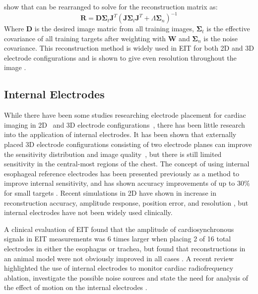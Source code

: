  show that  can 
be rearranged to solve for the reconstruction matrix
as:
\begin{equation} 
	\mathbf{R} = \mathbf{D}  
	\mathbf{\Sigma}_t \mathbf{J}^T(\mathbf{J}  
	 \mathbf{\Sigma}_t  \mathbf{J}^T + 
	 \Lambda \mathbf{\Sigma}_n)^{-1}
\end{equation}
Where $\mathbf{D}$ is the desired image matric from all training images,
$\mathbf{\Sigma}_t$  is the effective covariance of all training targets after weighting with 
$\mathbf{W}$ and 
$\mathbf{\Sigma}_n$ is the noise covariance. 
This reconstruction method is widely used in EIT for both 2D and 3D electrode configurations 
and is shown to give even resolution throughout the image \parencite{adler_greit_2009}.

\subsection{Internal Electrodes}

While there have been some studies researching electrode placement for cardiac
imaging in 2D~\parencite{vonk_noordegraaf_improvement_1996} and 
3D electrode configurations~\parencite{graham_electrode_2007}, there has 
been little research into the application of internal electrodes. 
It has been shown that externally placed 3D electrode configurations
consisting of two electrode planes
can improve the sensitivity distribution and image quality~\parencite{Grychtol2016},
but there is still limited sensitivity in the central-most regions 
of the chest.
The concept of using internal esophageal reference electrodes has been presented
previously
\parencite{Pilkington1989,Schuessler1995}
as a method to improve internal sensitivity, and has shown
accuracy improvements of up to 30\% for small 
targets \parencite{pilkington_utilization_1989}.
Recent simulations in 2D have shown in increase in reconstruction 
accuracy, amplitude response, position error, and resolution
\parencite{nasehi_tehrani_modelling_2012,nasehi_tehrani_evaluation_2012},
but internal electrodes have not been widely used clinically. 

A clinical evaluation of EIT found that the amplitude of cardiosynchronous signals 
in EIT measurements was 6 times larger when placing 2 of 16 total electrodes in 
either the esophagus or trachea, but found that reconstructions 
in an animal model were not obviously improved in all cases \parencite{czaplik_application_2014}.
A recent review highlighted the use of internal electrodes to monitor cardiac radiofrequency
ablation, investigate the possible noise sources and 
state the need for analysis of the effect of motion on the 
internal electrodes
\parencite{nguyen_electrical_2020}.

